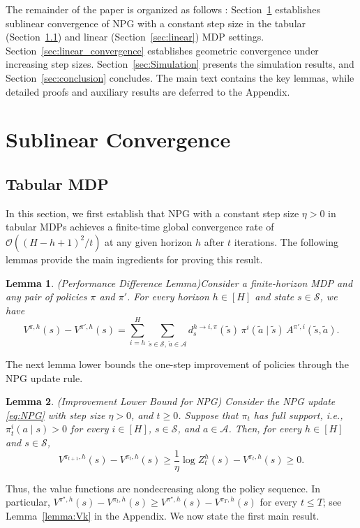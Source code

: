 \documentclass[11pt]{article}
\newtheorem{lem}{Lemma}
\begin{document}
The remainder of the paper is organized as follows : Section~\ref{sec:sublinear_convergence} establishes sublinear convergence of
NPG with a constant step size in the tabular (Section~\ref{sec:tabular}) and
linear (Section~\ref{sec:linear}) MDP settings.
Section~\ref{sec:linear_convergence} establishes geometric convergence under
increasing step sizes. Section~\ref{sec:Simulation} presents the simulation
results, and Section~\ref{sec:conclusion} concludes. The main text contains
the key lemmas, while detailed proofs and auxiliary results are deferred to
the Appendix.

\section{Sublinear Convergence}\label{sec:sublinear_convergence}
\subsection{Tabular MDP}\label{sec:tabular}
In this section, we first establish that NPG with a constant step size $\eta>0$ in
tabular MDPs achieves a finite-time global convergence rate of
$\mathcal{O}((H-h+1)^2/t)$ at any given horizon $h$ after $t$ iterations. The
following lemmas provide the main ingredients for proving this result.

\begin{lem}(Performance Difference Lemma)\label{lem:PDL}
 Consider a finite-horizon MDP and any pair of policies $\pi$ and $\pi'$. 
For every horizon $h \in [H]$ and state $s \in \mathcal{S}$, we have
\[
V^{\pi,h}(s)-V^{\pi',h}(s)
=
\sum_{i=h}^H
\sum_{\tilde{s}\in\mathcal{S},\,\tilde{a}\in\mathcal{A}}
d_s^{h\to i,\pi}(\tilde{s})\,
\pi^i(\tilde{a}\mid\tilde{s})\,
A^{\pi',i}(\tilde{s},\tilde{a}).
\]
\end{lem}

The next lemma lower bounds the one-step improvement of policies through the NPG update rule.

\begin{lem}(Improvement Lower Bound for NPG) \label{lem:ILB}
Consider the NPG update \eqref{eq:NPG} with step size $\eta>0$, and $t\ge0$. Suppose that $\pi_t$ has full support, i.e.,
$\pi_t^i(a\mid s)>0$ for every $i\in[H]$, $s\in\mathcal{S}$, and
$a\in\mathcal{A}$. Then, for every $h\in[H]$ and $s\in\mathcal{S}$,
\[
V^{\pi_{t+1},h}(s)-V^{\pi_t,h}(s)
\ge
\frac{1}{\eta}\log Z_t^h(s)-V^{\pi_t,h}(s)
\ge0.
\]
\end{lem}

Thus, the value functions are nondecreasing along the policy sequence. In
particular, $V^{\pi^\star,h}(s)-V^{\pi_t,h}(s)\ge
V^{\pi^\star,h}(s)-V^{\pi_T,h}(s)$ for every $t\le T$; see
Lemma~\ref{lemma:Vk} in the Appendix. We now state the first main result.
\end{document}
